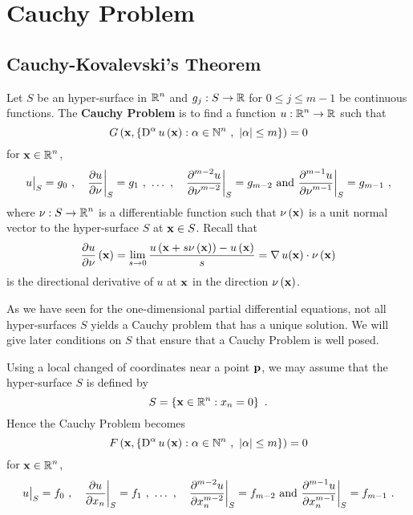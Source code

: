 \chapter{Cauchy Problem} \label{ChapterCauchyP}

\section{Cauchy-Kovalevski's Theorem}

Let $S$ be an hyper-surface in $\displaystyle \mathbb{R}^n$ and
$g_j:S\rightarrow \mathbb{R}$ for $0\leq j \leq m-1$ be continuous functions.
The {\bfseries Cauchy Problem} is to find a function
$\displaystyle u: \mathbb{R}^n \rightarrow \mathbb{R}$ such that
\begin{equation}\label{cp_GPDE}
G\left(\mathbf{x},
\left\{ \operatorname{D}^\alpha u\left(\mathbf{x}\right) : \alpha \in \mathbb{N}^n \ , \
  |\alpha|\leq m \right\} \right) = 0
\end{equation}
for $\displaystyle \mathbf{x} \in \mathbb{R}^n$,
\begin{equation}\label{cp_GPDE_cond}
u\big|_S = g_0 \ , \quad \pdydx{u}{\nu}\bigg|_S = g_1 \ ,
\ \ldots\ ,\quad \pdydxn{u}{\nu}{m-2}\bigg|_S = g_{m-2} \ 
\text{and} \ \pdydxn{u}{\nu}{m-1}\bigg|_S = g_{m-1} \ ,
\end{equation}
where $\displaystyle \nu:S \rightarrow \mathbb{R}^n$ is a differentiable
function such that $\nu\left(\mathbf{x}\right)$ is a unit normal vector
to the hyper-surface $S$ at $\mathbf{x} \in S$.  Recall that
\[
\frac{\partial{u}}{\partial \nu}\left(\mathbf{x}\right) =
\lim_{s\rightarrow 0} \frac{u\left(\mathbf{x}+s\nu\left(\mathbf{x}\right)\right) -
u\left(\mathbf{x}\right) }{s} = \operatorname{\nabla} u(\mathbf{x}) \cdot \nu\left(\mathbf{x}\right)
\]
is the directional derivative of $u$ at $\mathbf{x}$ in the direction
$\nu\left(\mathbf{x}\right)$.

As we have seen for the one-dimensional partial differential
equations, not all hyper-surfaces $S$ yields a Cauchy problem that has a
unique solution.  We will give later conditions on $S$ that ensure that a
Cauchy Problem is well posed.

Using a local changed of coordinates near a point $\mathbf{p}$, we may
assume that the hyper-surface $S$ is defined by
\[
S = \left\{ \mathbf{x} \in \mathbb{R}^n : x_n = 0 \right\} \ .
\]
Hence the Cauchy Problem becomes
\begin{equation} \label{cauchy_GPDE}
F\left(\VEC{x},
\left\{ \diff^\alpha u\left(\VEC{x}\right) : \alpha \in \NN^n \ , \ 
|\alpha| \leq m \right\} \right) = 0
\end{equation}
for $\displaystyle \mathbf{x} \in \mathbb{R}^n$,
\[
u\big|_S = f_0 \ , \quad \pdydx{u}{x_n}\bigg|_S = f_1 \ , \ 
\ldots \ , \quad \pdydxn{u}{x_n}{m-2}\bigg|_S = f_{m-2} \ \text{and}
\ \pdydxn{u}{x_n}{m-1}\bigg|_S = f_{m-1} \ .
\]


